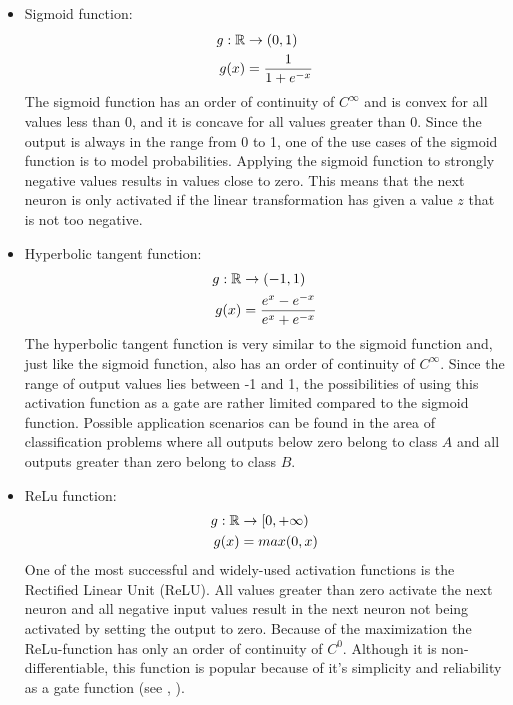 \begin{itemize}
	\item Sigmoid function: 
		\begin{equation}
		\begin{split}
			g: \mathbb{R} 	& \rightarrow (0,1) \\
			g(x) 	& = \frac{1}{1+e^{-x}} 
		\end{split}
		\end{equation}
		The sigmoid function has an order of continuity of $C^{\infty}$ and is convex for all values less than 0, and it is concave for all values greater than 0. Since the output is always in the range from 0 to 1, one of the use cases of the sigmoid function is to model probabilities. Applying the sigmoid function to strongly negative values results in values close to zero. This means that the next neuron is only activated if the linear transformation has given a value $z$ that is not too negative. 
	\item Hyperbolic tangent function: 
		\begin{equation}
		\begin{split}
			g: \mathbb{R} 	& \rightarrow (-1,1) \\
			g(x) 	& = \frac{e^x - e^{-x}}{e^x + e^{-x}} 
		\end{split}
		\end{equation}
		The hyperbolic tangent function is very similar to the sigmoid function and, just like the sigmoid function, also has an order of continuity of $C^{\infty}$. Since the range of output values lies between -1 and 1, the possibilities of using this activation function as a gate are rather limited compared to the sigmoid function. Possible application scenarios can be found in the area of classification problems where all outputs below zero belong to class $A$ and all outputs greater than zero belong to class $B$. 
		
	\item ReLu function: 
		\begin{equation}\label{eq:relu}
		\begin{split}
			g: \mathbb{R} 	& \rightarrow [0,+ \infty) \\
			g(x) 	& = max(0,x) 
		\end{split}
		\end{equation}
		One of the most successful and widely-used activation functions is the Rectified Linear Unit (ReLU). All values greater than zero activate the next neuron and all negative input values result in the next neuron not being activated by setting the output to zero. Because of the maximization the ReLu-function has only an order of continuity of $C^0$. Although it is non-differentiable, this function is popular because of it's simplicity and reliability as a gate function (see \cite{searchingActivation}, \cite{nair2010rectified}). 
			

\end{itemize}
